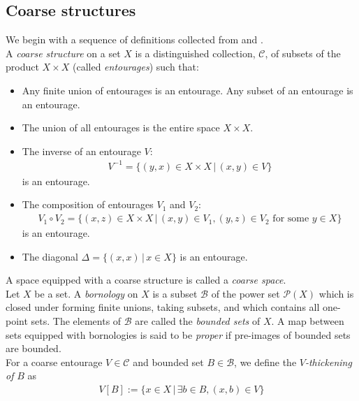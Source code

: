 \documentclass[a4paper,11pt]{article}
\theoremstyle{definition}
\theoremstyle{plain}
\theoremstyle{remark}
\begin{document}
\subsection{Coarse structures}

We begin with a sequence of definitions collected from \cite{bunke2020homotopy} and   \cite{mitchener2020coarse}.\\

A \textit{coarse structure} on a set $X$ is a distinguished collection, $\mathcal{C}$, of subsets of the product $X\times X$  (called \textit{entourages}) such that:
\begin{itemize}
\item Any finite union of entourages is an entourage. Any subset of an entourage is an entourage.
\item The union of all entourages is the entire space $X \times X$.
\item The inverse of an entourage $V$:
\begin{align*}
V^{-1} = \{(y,x)\in X\times X \,|\, (x,y)\in V\}
\end{align*}
is an entourage. 
\item The composition of entourages $V_1$ and $V_2$:
\begin{align*}
V_1\circ V_2 = \{(x,z)\in X\times X\,|\,(x,y)\in V_1, (y,z)\in V_{2} \text{ for some } y\in X\}
\end{align*}
is an entourage. 
\item The diagonal $\Delta = \{(x,x) \,|\, x\in X\}$ is an entourage. 
\end{itemize}

A space equipped with a coarse structure is called a \textit{coarse space}. \\

Let $X$ be a set. A \textit{bornology} on $X$ is a subset $\mathcal{B}$ of the power set $\mathcal{P}(X)$ which is closed under forming finite unions, taking subsets, and which contains all one-point sets. The elements of $\mathcal{B}$ are called the \textit{bounded sets} of $X$. A map between sets equipped with bornologies is said to be \textit{proper} if pre-images of bounded sets are bounded.\\

For a coarse entourage $V \in \mathcal{C}$ and bounded set $B\in \mathcal{B}$, we define the $V$\textit{-thickening of} $B$ as
\begin{align*}
V[B] := \{ x\in X\,|\, \exists b\in B, (x,b)\in V\}
\end{align*}
\end{document}
